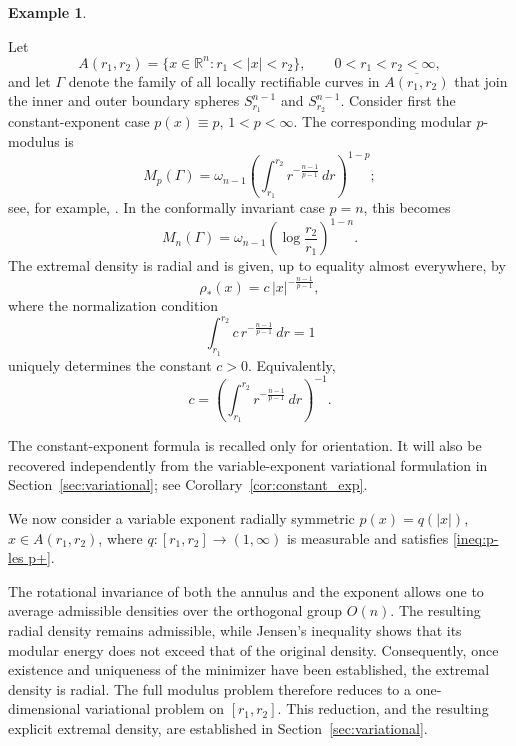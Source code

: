 \documentclass[12pt]{amsart}
\numberwithin{equation}{section}
\theoremstyle{plain}
\theoremstyle{definition}
\newtheorem{example}[equation]{Example}
\begin{document}
\begin{example}
\label{ex:annulus}
\rm

Let
\begin{equation*}
A(r_1,r_2)
=
\{x\in\mathbb{R}^n:r_1<|x|<r_2\},\qquad 0<r_1<r_2<\infty,
\end{equation*}
and let $\Gamma$ denote the family of all locally rectifiable curves
in $\overline{A(r_1,r_2)}$ that join the inner and outer boundary
spheres $S_{r_1}^{n-1}$ and $S_{r_2}^{n-1}$.
Consider first the constant-exponent case $p(x)\equiv p$, $1<p<\infty$.
The corresponding modular $p$-modulus is
\begin{equation*}
M_p(\Gamma)
=
\omega_{n-1}
\left(
\int_{r_1}^{r_2}
r^{-\frac{n-1}{p-1}}\,dr
\right)^{1-p};
\end{equation*}
see, for example, \cite{Hesse,VuorinenLNM}. In the conformally
invariant case $p=n$, this becomes
\begin{equation*}
M_n(\Gamma)
=
\omega_{n-1}
\left(
\log\frac{r_2}{r_1}
\right)^{1-n}.
\end{equation*}
The extremal density is radial and is given, up to equality almost
everywhere, by
\begin{equation*}
\rho_*(x)
=
c\,|x|^{-\frac{n-1}{p-1}},
\end{equation*}
where the normalization condition
\begin{equation*}
\int_{r_1}^{r_2}
c\,r^{-\frac{n-1}{p-1}}\,dr
=
1
\end{equation*}
uniquely determines the constant $c>0$. Equivalently,
\begin{equation*}
c
=
\left(
\int_{r_1}^{r_2}
r^{-\frac{n-1}{p-1}}\,dr
\right)^{-1}.
\end{equation*}

The constant-exponent formula is recalled only for orientation. It will
also be recovered independently from the variable-exponent
variational formulation in Section~\ref{sec:variational}; see
Corollary~\ref{cor:constant_exp}.

We now consider a variable exponent radially symmetric $p(x)=q(|x|)$, $x\in A(r_1,r_2)$,
where $q:[r_1,r_2]\longrightarrow(1,\infty)$
is measurable and satisfies \eqref{ineq:p- les p+}.

The rotational invariance of both the annulus and the exponent allows
one to average admissible densities over the orthogonal group
$O(n)$. The resulting radial density remains admissible, while
Jensen's inequality shows that its modular energy does not exceed that
of the original density. Consequently, once existence and uniqueness
of the minimizer have been established, the extremal density is radial.
The full modulus problem therefore reduces to a one-dimensional
variational problem on $[r_1,r_2]$. This reduction, and the resulting
explicit extremal density, are established in
Section~\ref{sec:variational}.
\end{example}
\end{document}
